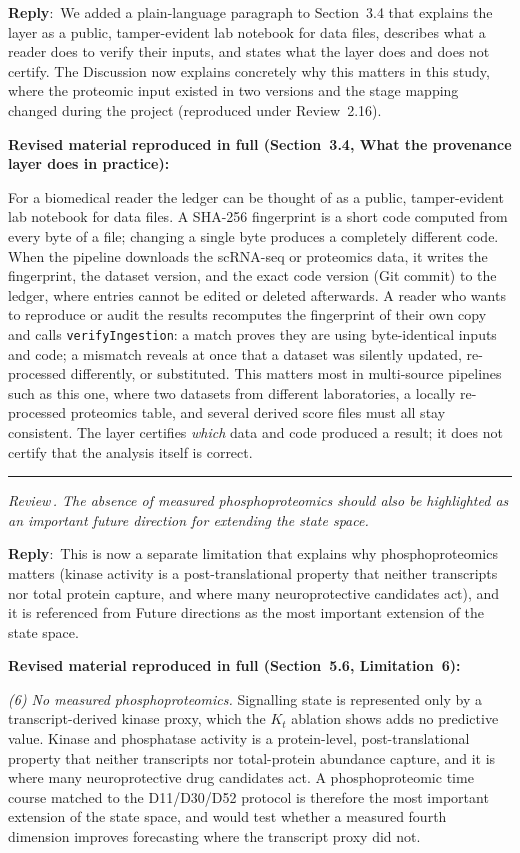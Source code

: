 \documentclass[11pt]{article}
\newcounter{reviewer}
\newcounter{point}[reviewer]
\renewcommand{\thepoint}{Review\,\thereviewer.\arabic{point}}
\newcommand{\point}[1]{\refstepcounter{point}  \bigskip \hrule \medskip \noindent \textit{{\fontseries{b}\selectfont \thepoint } #1}\par}
\newcommand{\reply}{\medskip \noindent \textbf{Reply}:\ }
\newcommand{\revisedheading}[1]{\medskip\noindent\textbf{Revised material
  reproduced in full (#1):}\par}
\newenvironment{revised}{\par\color{red}}{\par}
\begin{document}
\reply{We added a plain-language paragraph to Section~3.4 that explains the layer as a public, tamper-evident lab notebook for data files, describes what a reader does to verify their inputs, and states what the layer does and does not certify. The Discussion now explains concretely why this matters in this study, where the proteomic input existed in two versions and the stage mapping changed during the project (reproduced under Review~2.16).}

\revisedheading{Section~3.4, What the provenance layer does in practice}
\begin{revised}
For a biomedical reader the ledger can be thought of as a public, tamper-evident lab notebook for data files. A SHA-256 fingerprint is a short code computed from every byte of a file; changing a single byte produces a completely different code. When the pipeline downloads the scRNA-seq or proteomics data, it writes the fingerprint, the dataset version, and the exact code version (Git commit) to the ledger, where entries cannot be edited or deleted afterwards. A reader who wants to reproduce or audit the results recomputes the fingerprint of their own copy and calls \texttt{verifyIngestion}: a match proves they are using byte-identical inputs and code; a mismatch reveals at once that a dataset was silently updated, re-processed differently, or substituted. This matters most in multi-source pipelines such as this one, where two datasets from different laboratories, a locally re-processed proteomics table, and several derived score files must all stay consistent. The layer certifies \textit{which} data and code produced a result; it does not certify that the analysis itself is correct.
\end{revised}

\point{The absence of measured phosphoproteomics should also be highlighted as an important future direction for extending the state space.}

\reply{This is now a separate limitation that explains why phosphoproteomics matters (kinase activity is a post-translational property that neither transcripts nor total protein capture, and where many neuroprotective candidates act), and it is referenced from Future directions as the most important extension of the state space.}

\revisedheading{Section~5.6, Limitation~6}
\begin{revised}
\textit{(6) No measured phosphoproteomics.} Signalling state is represented only by a transcript-derived kinase proxy, which the $K_t$ ablation shows adds no predictive value. Kinase and phosphatase activity is a protein-level, post-translational property that neither transcripts nor total-protein abundance capture, and it is where many neuroprotective drug candidates act. A phosphoproteomic time course matched to the D11/D30/D52 protocol is therefore the most important extension of the state space, and would test whether a measured fourth dimension improves forecasting where the transcript proxy did not.
\end{revised}
\end{document}
